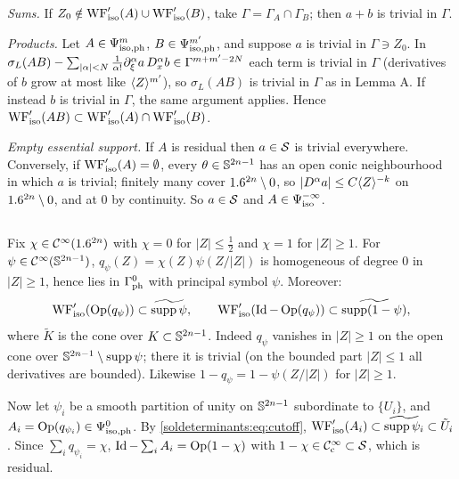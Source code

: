 \emph{Sums.} If $Z_0\notin\operatorname{WF}_{\mathrm{iso}}'(A)\cup\operatorname{WF}_{\mathrm{iso}}'(B)$, take $\Gamma=\Gamma_A\cap\Gamma_B$; then $a+b$ is
trivial in $\Gamma$.

\emph{Products.} Let $A\in\Psi^{m}_{\mathrm{iso,ph}}$, $B\in\Psi^{m'}_{\mathrm{iso,ph}}$, and suppose $a$ is trivial in $\Gamma\ni Z_0$.
In $\sigma_L(AB)-\sum_{|\alpha|<N}\frac1{\alpha!}\partial_\xi^\alpha a\,D_x^\alpha b\in\Gamma^{m+m'-2N}$ each term is trivial in
$\Gamma$ (derivatives of $b$ grow at most like $\langle Z\rangle^{m'}$), so $\sigma_L(AB)$ is trivial in $\Gamma$ as in
Lemma A. If instead $b$ is trivial in $\Gamma$, the same argument applies. Hence
$\operatorname{WF}_{\mathrm{iso}}'(AB)\subset\operatorname{WF}_{\mathrm{iso}}'(A)\cap\operatorname{WF}_{\mathrm{iso}}'(B)$.

\emph{Empty essential support.} If $A$ is residual then $a\in\mathcal{S}$ is trivial everywhere. Conversely, if
$\operatorname{WF}_{\mathrm{iso}}'(A)=\emptyset$, every $\theta\in\mathbb{S}^{2n-1}$ has an open conic neighbourhood in which $a$ is
trivial; finitely many cover $1.6^{2n}\setminus0$, so $|D^\alpha a|\le C\langle Z\rangle^{-k}$ on $1.6^{2n}\setminus0$,
and at $0$ by continuity. So $a\in\mathcal{S}$ and $A\in\Psi^{-\infty}_{\mathrm{iso}}$.

\subsection*{}
Fix $\chi\in\mathcal{C}^\infty(1.6^{2n})$ with $\chi=0$ for $|Z|\le\frac12$ and $\chi=1$ for $|Z|\ge1$. For
$\psi\in\mathcal{C}^\infty(\mathbb{S}^{2n-1})$, $q_\psi(Z)=\chi(Z)\psi(Z/|Z|)$ is homogeneous of degree $0$ in $|Z|\ge1$,
hence lies in $\Gamma^{0}_{\mathrm{ph}}$ with principal symbol $\psi$. Moreover:
\begin{equation}\label{soldeterminants:eq:cutoff}
  \operatorname{WF}_{\mathrm{iso}}'(\operatorname{Op}(q_\psi))\subset\widetilde{\operatorname{supp}\psi},\qquad
  \operatorname{WF}_{\mathrm{iso}}'(\operatorname{Id}-\operatorname{Op}(q_\psi))\subset\widetilde{\operatorname{supp}(1-\psi)},
\end{equation}
where $\tilde K$ is the cone over $K\subset\mathbb{S}^{2n-1}$. Indeed $q_\psi$ vanishes in $|Z|\ge1$ on the open
cone over $\mathbb{S}^{2n-1}\setminus\operatorname{supp}\psi$; there it is trivial (on the bounded part $|Z|\le1$ all
derivatives are bounded). Likewise $1-q_\psi=1-\psi(Z/|Z|)$ for $|Z|\ge1$.

Now let $\psi_i$ be a smooth partition of unity on $\mathbb{S}^{2n-1}$ subordinate to $\{U_i\}$, and
$A_i=\operatorname{Op}(q_{\psi_i})\in\Psi^{0}_{\mathrm{iso,ph}}$. By \eqref{soldeterminants:eq:cutoff},
$\operatorname{WF}_{\mathrm{iso}}'(A_i)\subset\widetilde{\operatorname{supp}\psi_i}\subset\tilde U_i$. Since $\sum_iq_{\psi_i}=\chi$,
$\operatorname{Id}-\sum_iA_i=\operatorname{Op}(1-\chi)$ with $1-\chi\in\mathcal{C}^\infty_{\mathrm{c}}\subset\mathcal{S}$, which is residual.

